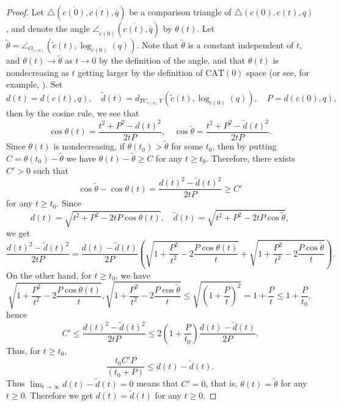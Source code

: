\documentclass[12pt]{amsart}
\numberwithin{equation}{section}
\theoremstyle{plain}
\theoremstyle{definition}
\theoremstyle{remark}
\newcommand{\tcprj}{\log}
\newcommand{\cat}[1]{\mathrm{CAT}(#1)}
\newcommand{\tri}[3]{\triangle(#1,#2,#3)}
\begin{document}
\begin{proof}
 Let $\tri{\overline{c(0)}}{\overline{c(t)}}{\overline{q}}$ be a
 comparison triangle of $\tri{c(0)}{c(t)}{q}$, and denote the
 angle $\angle_{\overline{c(0)}} (\overline{c(t)},\overline{q})$
 by $\theta(t)$.  Let
 $\tilde \theta = \angle_{O_{c(0)}}(\tilde c(t),\tcprj_{c(0)}(q))$. 
 Note that $\tilde \theta$ is a constant independent of $t$, and 
 $\theta(t)\to \tilde \theta$ as $t \to 0$ by the definition of the
 angle, and that 
 $\theta(t)$ is nondecreasing as $t$ getting larger
 by the definition of $\cat{0}$ space 
 (or see, for example, \cite[p.~161, 1.7(3)]{bridson-haefliger}).  
 Set 
\begin{equation*}
 d(t) = d(c(t),q), \quad 
 \tilde d(t) =d_{TC_{c(0)}Y}(\tilde c(t),\tcprj_{c(0)}(q)), \quad 
 P= d(c(0),q), 
\end{equation*}
 then by the cosine rule, 
 we see that 
\begin{equation*}
 \cos \theta(t) = \frac{t^2 + P^2 - d(t)^2}{2tP}, \quad
 \cos \tilde \theta = \frac{t^2 + P^2 - \tilde d(t)^2}{2tP}. 
\end{equation*}
 Since  $\theta(t)$ is nondecreasing, if $\theta(t_0) > \tilde \theta$
 for some $t_0$, then by putting $C=\theta(t_0)-\tilde \theta$ we have
 $\theta(t)-\tilde \theta\geq C$ for any $t\geq t_0$. 
 Therefore, there exists $C'>0$ such that 
 \begin{equation*}
   \cos \tilde \theta - \cos \theta(t)
  = \frac{d(t)^2-\tilde d(t)^2}{2tP} \geq C'  
 \end{equation*}
 for any $t \geq t_0$. 
 Since
 \begin{equation*}
  d(t)=\sqrt{t^2 + P^2 -2tP\cos \theta(t)}, \quad
   \tilde d(t)= \sqrt{t^2+P^2 - 2tP\cos \tilde \theta}, 
 \end{equation*}
 we get  
 \begin{equation*}
  \frac{d(t)^2-\tilde d(t)^2}{2tP}
   = \frac{d(t)-\tilde d(t)}{2P}
   \left(\sqrt{1 + \frac{P^2}{t^2} -2\frac{P\cos \theta(t)}{t}}
    + \sqrt{1 + \frac{P^2}{t^2} -2\frac{P\cos \tilde \theta}{t}}
   \right). 
 \end{equation*}
 On the other hand, for $t\geq t_0$, we have
 \begin{equation*}
  \sqrt{1 + \frac{P^2}{t^2} -2\frac{P\cos \theta(t)}{t}},
   \sqrt{1 + \frac{P^2}{t^2} -2\frac{P\cos \tilde \theta}{t}}
   \leq \sqrt{\left(1+\frac{P}{t} \right)^2}
   = 1 + \frac{P}{t} \leq 1 + \frac{P}{t_0}, 
 \end{equation*}
 hence 
 \begin{equation*}
  C' \leq \frac{d(t)^2-\tilde d(t)^2}{2tP}
   \leq 
  2\left(1 + \frac{P}{t_0}\right) 
  \frac{d(t)-\tilde d(t)}{2P}. 
 \end{equation*}
 Thus, for $t\geq t_0$, 
 \begin{equation*}
   \frac{t_0C'P}{(t_0 + P)} \leq
  d(t)-\tilde d(t) . 
 \end{equation*}
 Thus $\lim_{t\to \infty} d(t)-\tilde d(t)=0$ means that $C'=0$, that
 is, $\theta(t)=\tilde \theta$ for any $t \geq 0$.   
 Therefore we get $d(t)=\tilde d(t)$ for any $t \geq 0$. 
\end{proof}
\end{document}
